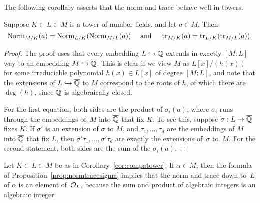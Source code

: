 The following corollary asserts that the norm and trace behave well in
towers.
\begin{corollary}\label{cor:compatower}
Suppose $K\subset L \subset M$ is a tower of number fields, and
let $a\in M$.  Then 
$$
\operatorname{Norm}_{M/K}(a) = \operatorname{Norm}_{L/K}(\operatorname{Norm}_{M/L}(a))
\quad\text{ and }\quad
\operatorname{tr}_{M/K}(a) = \operatorname{tr}_{L/K}(\operatorname{tr}_{M/L}(a)).
$$
\end{corollary}
\begin{proof}
The proof uses that every embedding $L\hookrightarrow \overline{\mathbb{Q}}$ extends in exactly
$[M:L]$ way to an embedding $M\hookrightarrow \overline{\mathbb{Q}}$.  This is clear
if we view $M$ as $L[x]/(h(x))$ for some irreducicble
polynomial $h(x) \in L[x]$ of degree $[M:L]$, and note that 
the extensions of $L\hookrightarrow \overline{\mathbb{Q}}$ to $M$ correspond to
the roots of $h$, of which there are $\deg(h)$, since $\overline{\mathbb{Q}}$
is algebraically closed.

  For the first equation, both sides are the product of $\sigma_i(a)$,
  where $\sigma_i$ runs through the embeddings of~$M$ into $\overline{\mathbb{Q}}$
  that fix $K$.  To see this, suppose $\sigma:L\to \overline{\mathbb{Q}}$ fixes $K$.
  If $\sigma'$ is an extension of $\sigma$ to $M$, and $\tau_1,\ldots,
  \tau_d$ are the embeddings of $M$ into $\overline{\mathbb{Q}}$ that fix $L$, then
  $\sigma'\tau_1,\ldots,\sigma'\tau_d$ are exactly the extensions
  of~$\sigma$ to~$M$.  For the second statement, both sides are the
  sum of the $\sigma_i(a)$.
\end{proof}

Let $K\subset L\subset M$ be as in Corollary~\ref{cor:compatower}.  If
$\alpha\in M$, then the formula of
Proposition~\ref{prop:normtracesigma} implies that the norm and trace
down to~$L$ of $\alpha$ is an element of~$\mathcal{O}_L$, because the sum and
product of algebraic integers is an algebraic integer.

